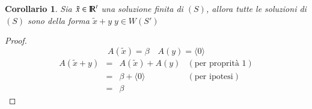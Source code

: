 \documentclass[12pt,a4paper]{article}
\theoremstyle{break}
\newtheorem{corollary}{Corollario}[theorem]
\newcommand\R{{\rm I\!R}}
\begin{document}
    \begin{corollary}
        Sia $\tilde{x}\in\R^t$ una soluzione finita di $(S)$, allora tutte le soluzioni di $(S)$ sono della forma $\tilde{x} + y\; y\in W(S')$
    \end{corollary}
    \begin{proof}
        \[A(\tilde{x}) = \beta\quad A(y) = \langle 0 \rangle\]
        \[
            \begin{matrix}
                A(\tilde{x} + y) & = & A(\tilde{x}) + A(y) & (\text{per proprità 1}) \\
                & = & \beta + \langle 0 \rangle & (\text{per ipotesi}) \\
                & = & \beta
            \end{matrix}
        \]
    \end{proof}
    \newpage
\end{document}
